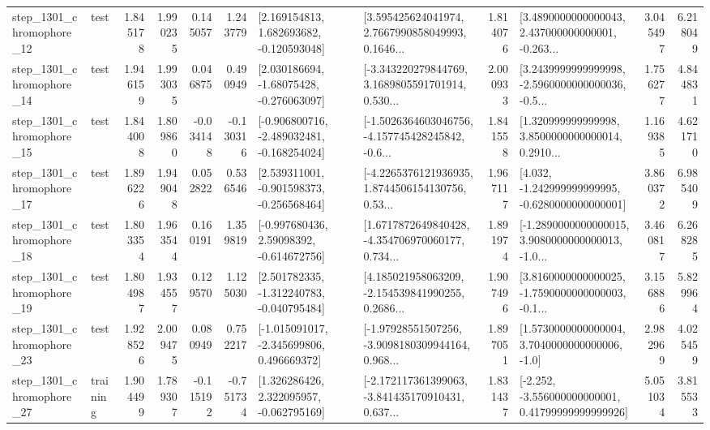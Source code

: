 \begin{tabular}{llrrrrllrlrr}
 step\_1301\_chromophore\_12 &      test &      1.845178 &    1.990235 &      0.145057 &  1.243779 &    [2.169154813, 1.682693682, -0.120593048] &  [3.595425624041974, 2.7667990858049993, 0.1646... &       1.814076 &  [3.4890000000000043, 2.437000000000001, -0.263... &            3.045497 &          6.218049 \\
 step\_1301\_chromophore\_14 &      test &      1.946159 &    1.993035 &      0.046875 &  0.490949 &    [2.030186694, -1.68075428, -0.276063097] &  [-3.343220279844769, 3.1689805591701914, 0.530... &       2.000933 &  [3.2439999999999998, -2.5960000000000036, -0.5... &            1.756277 &          4.844831 \\
 step\_1301\_chromophore\_15 &      test &      1.844008 &    1.809860 &     -0.034148 & -0.130316 &  [-0.906800716, -2.489032481, -0.168254024] &  [-1.5026364603046756, -4.157745428245842, -0.6... &       1.841558 &  [1.320999999999998, 3.8500000000000014, 0.2910... &            1.169385 &          4.621710 \\
 step\_1301\_chromophore\_17 &      test &      1.896226 &    1.949048 &      0.052822 &  0.536546 &   [2.539311001, -0.901598373, -0.256568464] &  [-4.2265376121936935, 1.8744506154130756, 0.53... &       1.967117 &   [4.032, -1.242999999999995, -0.6280000000000001] &            3.860372 &          6.985409 \\
 step\_1301\_chromophore\_18 &      test &      1.803354 &    1.963544 &      0.160191 &  1.359819 &    [-0.997680436, 2.59098392, -0.614672756] &  [1.6717872649840428, -4.354706970060177, 0.734... &       1.891974 &  [-1.2890000000000015, 3.9080000000000013, -1.0... &            3.460817 &          6.268285 \\
 step\_1301\_chromophore\_19 &      test &      1.804987 &    1.934557 &      0.129570 &  1.125030 &   [2.501782335, -1.312240783, -0.040795484] &  [4.185021958063209, -2.154539841990255, 0.2686... &       1.907496 &  [3.8160000000000025, -1.7590000000000003, -0.1... &            3.156886 &          5.829964 \\
 step\_1301\_chromophore\_23 &      test &      1.928526 &    2.009475 &      0.080949 &  0.752217 &   [-1.015091017, -2.345699806, 0.496669372] &  [-1.97928551507256, -3.9098180309944164, 0.968... &       1.897051 &     [1.5730000000000004, 3.7040000000000006, -1.0] &            2.982969 &          4.025459 \\
 step\_1301\_chromophore\_27 &  training &      1.904499 &    1.789307 &     -0.115192 & -0.751734 &    [1.326286426, 2.322095957, -0.062795169] &  [-2.172117361399063, -3.841435170910431, 0.637... &       1.831437 &  [-2.252, -3.556000000000001, 0.41799999999999926] &            5.051034 &          3.815533 \\

\end{tabular}
